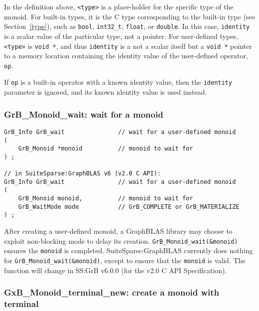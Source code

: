 \documentclass[12pt]{article}
\begin{document}
In the definition above, \verb'<type>' is a place-holder for the specific type
of the monoid.  For built-in types, it is the C type corresponding to the
built-in type (see Section~\ref{type}), such as \verb'bool', \verb'int32_t',
\verb'float', or \verb'double'.  In this case, \verb'identity' is a
scalar value of the particular type, not a pointer.  For
user-defined types, \verb'<type>' is \verb'void *', and thus \verb'identity' is
a not a scalar itself but a \verb'void *' pointer to a memory location
containing the identity value of the user-defined operator, \verb'op'.

If \verb'op' is a built-in operator with a known identity value, then the
\verb'identity' parameter is ignored, and its known identity value is used
instead.

\subsubsection{{\sf GrB\_Monoid\_wait:} wait for a monoid}
\label{monoid_wait}

\begin{mdframed}[userdefinedwidth=6in]
{\footnotesize
\begin{verbatim}
GrB_Info GrB_wait               // wait for a user-defined monoid
(
    GrB_Monoid *monoid          // monoid to wait for
) ;

// in SuiteSparse:GraphBLAS v6 (v2.0 C API):
GrB_Info GrB_wait               // wait for a user-defined monoid
(
    GrB_Monoid monoid,          // monoid to wait for
    GrB_WaitMode mode           // GrB_COMPLETE or GrB_MATERIALIZE
) ;
\end{verbatim}
}\end{mdframed}

After creating a user-defined monoid, a GraphBLAS library may choose to exploit
non-blocking mode to delay its creation.  \verb'GrB_Monoid_wait(&monoid)'
ensures the \verb'monoid' is completed.  SuiteSparse:GraphBLAS currently does
nothing for \verb'GrB_Monoid_wait(&monoid)', except to ensure that the
\verb'monoid' is valid.
The function will change in SS:GrB v6.0.0 (for the v2.0 C API Specification).

\newpage
\subsubsection{{\sf GxB\_Monoid\_terminal\_new:} create a monoid with terminal}
\label{monoid_terminal_new}
\end{document}
